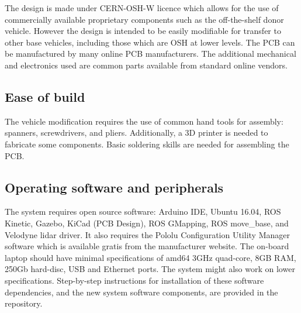 \documentclass[a4paper]{article}
\begin{document}
	
	The design is made under CERN-OSH-W licence which allows for the use of commercially available proprietary components such as the off-the-shelf donor vehicle. However the design is intended to be easily modifiable for transfer to other base vehicles, including those which are OSH at lower levels. The PCB can be manufactured by many online PCB manufacturers. The additional mechanical and electronics used are common parts available from standard online vendors. 
	
	\subsection{Ease of build}\label{h.wg823sgyb1e4}
	
	
	The vehicle modification requires the use of common hand tools for assembly: spanners, screwdrivers, and pliers. Additionally, a 3D printer is needed to fabricate some components. Basic soldering skills are needed for assembling the PCB. 
	
	\subsection{Operating software and peripherals}\label{h.uz77dixfh5i4}
	
	
	
	The system requires open source software: Arduino IDE, Ubuntu 16.04, ROS Kinetic, Gazebo, KiCad (PCB Design), ROS GMapping, ROS move\_base, and Velodyne lidar driver. It also requires the Pololu Configuration Utility Manager software which is available gratis from the manufacturer website. The on-board laptop should have minimal specifications of amd64 3GHz quad-core, 8GB RAM, 250Gb hard-disc, USB and Ethernet ports. The system might also work on lower specifications. Step-by-step instructions for installation of these software dependencies, and the new system software components, are provided in the repository.
	
\end{document}
